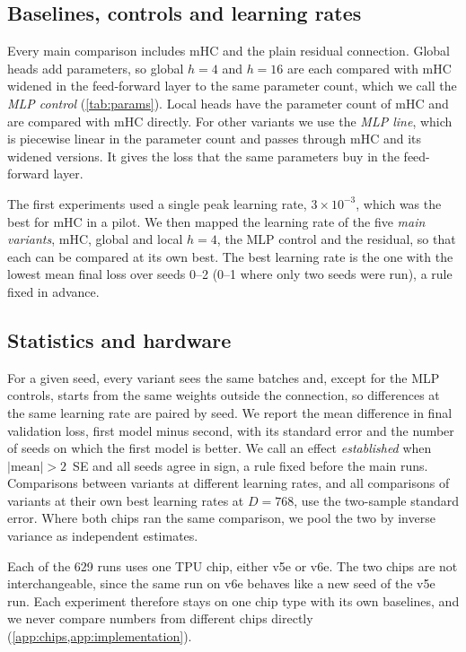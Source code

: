 \documentclass[11pt, a4paper]{article}
\newcommand{\lr}[1]{\ensuremath{#1 \times 10^{-3}}}
\begin{document}
\subsection{Baselines, controls and learning rates}
\label{sec:controls}

Every main comparison includes mHC and the plain residual connection. Global heads add parameters, so global $h = 4$ and $h = 16$ are each compared with mHC widened
in the feed-forward layer to the same parameter count, which we call the \emph{MLP control} (\cref{tab:params}). Local heads have
the parameter count of mHC and are compared with mHC directly. For other variants we use the \emph{MLP line}, which is piecewise linear
in the parameter count and passes through mHC and its widened versions. It gives the loss that the same parameters buy in the feed-forward
layer.
\label{sec:lrs}

The first experiments used a single peak learning rate, \lr{3}, which was the best for mHC in a pilot. We then mapped the learning
rate of the five \emph{main variants}, mHC, global and local $h = 4$, the MLP control and the residual, so that each can be compared at its own best. The best
learning rate is the one with the lowest mean final loss over seeds 0--2 (0--1 where only two seeds were run), a rule fixed in advance.

\subsection{Statistics and hardware}
\label{sec:stats}
\label{sec:hardware}

For a given seed, every variant sees the same batches and, except for the MLP controls, starts from the same weights outside the
connection, so differences at the same learning rate are paired by seed. We report the mean difference in final validation loss, first model minus second, with its
standard error and the number of seeds on which the first model is better. We call an effect \emph{established} when $|\text{mean}| > 2$~SE and
all seeds agree in sign, a rule fixed before the main runs. Comparisons between variants at different learning rates, and all
comparisons of variants at their own best learning rates at $D = 768$, use the two-sample standard error. Where both chips ran the same
comparison, we pool the two by inverse variance as independent estimates.

Each of the 629 runs uses one TPU chip, either v5e or v6e. The two chips are not interchangeable, since the same run on v6e behaves like a
new seed of the v5e run. Each experiment therefore stays on one chip type with its own baselines, and we never compare numbers
from different chips directly (\cref{app:chips,app:implementation}).
\end{document}
